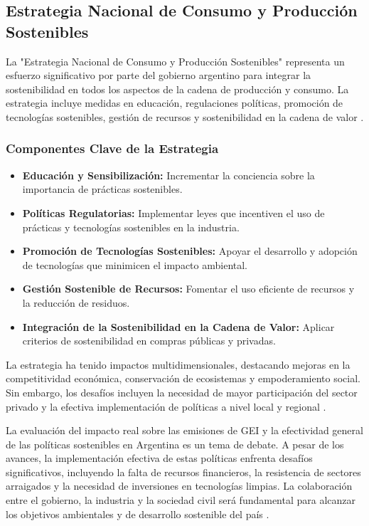 \documentclass[main.tex]{subfiles}
\begin{document}
\subsection{Estrategia Nacional de Consumo y Producción Sostenibles}

La "Estrategia Nacional de Consumo y Producción Sostenibles" representa un esfuerzo significativo por parte del gobierno argentino para integrar la sostenibilidad en todos los aspectos de la cadena de producción y consumo. La estrategia incluye medidas en educación, regulaciones políticas, promoción de tecnologías sostenibles, gestión de recursos y sostenibilidad en la cadena de valor \cite{sostenible2021argentina}.

\subsubsection{Componentes Clave de la Estrategia}

\begin{itemize}
    \item \textbf{Educación y Sensibilización:} Incrementar la conciencia sobre la importancia de prácticas sostenibles.
    \item \textbf{Políticas Regulatorias:} Implementar leyes que incentiven el uso de prácticas y tecnologías sostenibles en la industria.
    \item \textbf{Promoción de Tecnologías Sostenibles:} Apoyar el desarrollo y adopción de tecnologías que minimicen el impacto ambiental.
    \item \textbf{Gestión Sostenible de Recursos:} Fomentar el uso eficiente de recursos y la reducción de residuos.
    \item \textbf{Integración de la Sostenibilidad en la Cadena de Valor:} Aplicar criterios de sostenibilidad en compras públicas y privadas.
\end{itemize}

La estrategia ha tenido impactos multidimensionales, destacando mejoras en la competitividad económica, conservación de ecosistemas y empoderamiento social. Sin embargo, los desafíos incluyen la necesidad de mayor participación del sector privado y la efectiva implementación de políticas a nivel local y regional \cite{sostenible2021argentina}.

La evaluación del impacto real sobre las emisiones de GEI y la efectividad general de las políticas sostenibles en Argentina es un tema de debate. A pesar de los avances, la implementación efectiva de estas políticas enfrenta desafíos significativos, incluyendo la falta de recursos financieros, la resistencia de sectores arraigados y la necesidad de inversiones en tecnologías limpias. La colaboración entre el gobierno, la industria y la sociedad civil será fundamental para alcanzar los objetivos ambientales y de desarrollo sostenible del país \cite{dormido2021fundar, sostenible2021argentina}.
\end{document}
